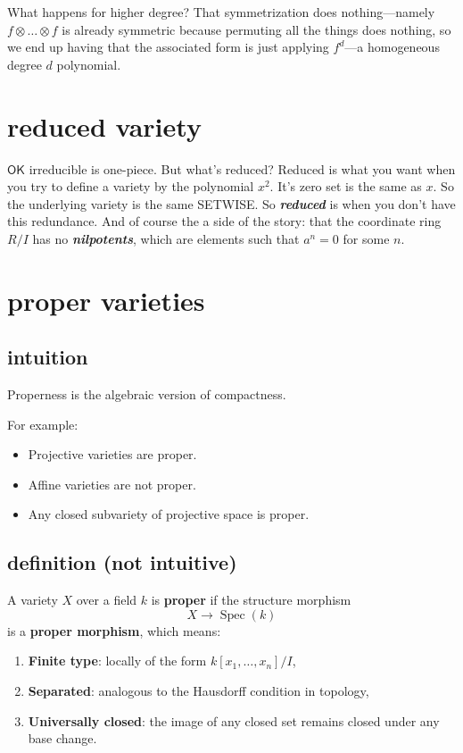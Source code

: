 What happens for higher degree? That symmetrization does nothing---namely \(f \otimes \ldots \otimes f\) is already symmetric because permuting all the things does nothing, so we end up having that the associated form is just applying \(f^d\)---a homogeneous degree \(d\) polynomial.

\section{reduced variety}
\(\mathsf{OK}\) irreducible is one-piece. But what's reduced? Reduced is what you want when you try to define a variety by the polynomial \(x^2\). It's zero set is the same as \(x\). So the underlying variety is the same SETWISE. So \textit{\textbf{reduced}} is when you don't have this redundance. And of course the a side of the story: that the coordinate ring  \(R/I\) has no \textit{\textbf{nilpotents}}, which are elements such that \(a^n=0\) for some \(n\).

\section{proper varieties}
\subsection*{intuition}
Properness is the algebraic version of compactness.

For example:

\begin{itemize}
\item Projective varieties are proper.

\item Affine varieties are not proper.

\item Any closed subvariety of projective space is proper.
\end{itemize}

\subsection*{definition (not intuitive)}
A variety \( X \) over a field \( k \) is \textbf{proper} if the structure morphism
\[
X \to \operatorname{Spec}(k)
\]
is a \textbf{proper morphism}, which means:
\begin{enumerate}
  \item \textbf{Finite type}: locally of the form \( k[x_1, \dots, x_n]/I \),
  \item \textbf{Separated}: analogous to the Hausdorff condition in topology,
  \item \textbf{Universally closed}: the image of any closed set remains closed under any base change.
\end{enumerate}



